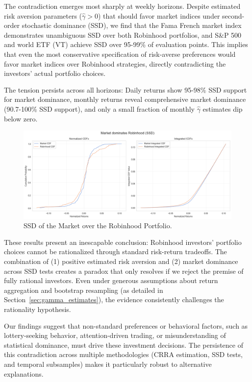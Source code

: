 The contradiction emerges most sharply at weekly horizons. 
Despite estimated risk aversion parameters (\(\hat{\gamma} > 0\)) that should favor market indices under second-order stochastic dominance (SSD), we find that the Fama French market index demonstrates unambiguous SSD over both Robinhood portfolios, 
and S\&P 500 and world ETF (VT) achieve SSD over 95-99\% of evaluation points.
This implies that even the most conservative specification of risk-averse preferences would favor market indices over Robinhood strategies, directly contradicting the investors' actual portfolio choices.

The tension persists across all horizons: Daily returns show 95-98\% SSD support for market dominance, monthly returns reveal comprehensive market dominance (90.7-100\% SSD support), and only a small fraction of monthly \(\hat{\gamma}\) estimates dip below zero.

\begin{figure}[H]
    \centering
    \includegraphics[width=0.8\linewidth]{../images/risk/ssd_number_5d_mkt.png}
    \caption{SSD of the Market over the Robinhood Portfolio.}
    \label{fig:fsd_fedyk_mine}
\end{figure}    

These results present an inescapable conclusion: Robinhood investors' portfolio choices cannot be rationalized through standard risk-return tradeoffs. 
The combination of (1) positive estimated risk aversion and (2) market dominance across SSD tests creates a paradox that only resolves if we reject the premise of fully rational investors.
Even under generous assumptions about return aggregation and bootstrap resampling (as detailed in Section~\ref{sec:gamma_estimates}), the evidence consistently challenges the rationality hypothesis.

Our findings suggest that non-standard preferences or behavioral factors, such as lottery-seeking behavior, attention-driven trading, or misunderstanding of statistical dominance, must drive these investment decisions. 
The persistence of this contradiction across multiple methodologies (CRRA estimation, SSD tests, and temporal subsamples) makes it particularly robust to alternative explanations.


